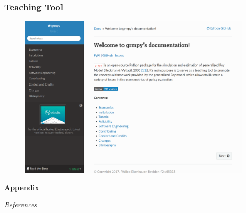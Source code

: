 \begin{frame}
\frametitle{Teaching Tool}
\begin{figure}[htp]\centering
	\includegraphics[width=\textwidth]{./material/fig-online-documentation.png}
\end{figure}
\end{frame}


    

\beginbackup
\appendix
\begin{frame}\begin{center}
\LARGE\textbf{Appendix}
\end{center}\end{frame}

\begin{frame}\begin{center}
\LARGE\textit{References}
\end{center}\end{frame}
\begin{frame}[allowframebreaks]\frametitle{}

\nocite{Abbring.2007,Carneiro.2003,Carneiro.2011,Heckman.2001g,Heckman.2008a,Heckman.1997,Heckman.2006d,Heckman.2001d,Heckman.2001e,Heckman.2005e,Heckman.2007e,Heckman.2007f,Roy.1951}



%

\end{frame}


\backupend
